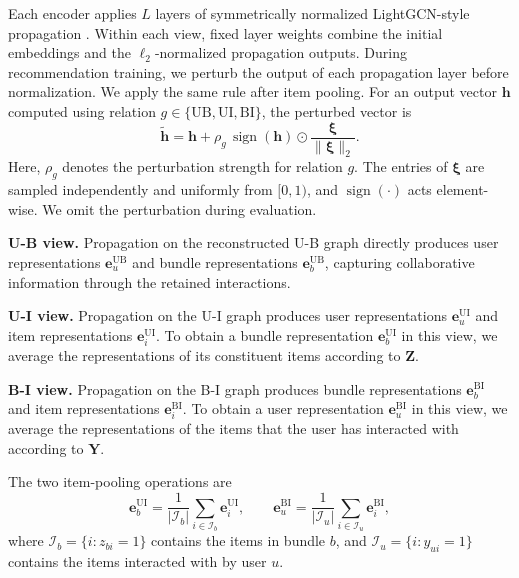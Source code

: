 \documentclass[letterpaper,journal]{IEEEtran}
\begin{document}
Each encoder applies $L$ layers of symmetrically normalized LightGCN-style propagation \cite{he2020lightgcn}. Within each view, fixed layer weights combine the initial embeddings and the $\ell_2$-normalized propagation outputs. During recommendation training, we perturb the output of each propagation layer before normalization. We apply the same rule after item pooling. For an output vector $\mathbf h$ computed using relation $g\in\{\mathrm{UB},\mathrm{UI},\mathrm{BI}\}$, the perturbed vector is
\begin{equation}
\widetilde{\mathbf h}
=\mathbf h+\rho_g\,\operatorname{sign}(\mathbf h)
\odot\frac{\boldsymbol\xi}{\|\boldsymbol\xi\|_2}.
\tag{13}
\end{equation}
Here, $\rho_g$ denotes the perturbation strength for relation $g$. The entries of $\boldsymbol\xi$ are sampled independently and uniformly from $[0,1)$, and $\operatorname{sign}(\cdot)$ acts element-wise. We omit the perturbation during evaluation.

\textbf{U-B view.} Propagation on the reconstructed U-B graph directly produces user representations $\mathbf e_u^{\mathrm{UB}}$ and bundle representations $\mathbf e_b^{\mathrm{UB}}$, capturing collaborative information through the retained interactions.

\textbf{U-I view.} Propagation on the U-I graph produces user representations $\mathbf e_u^{\mathrm{UI}}$ and item representations $\mathbf e_i^{\mathrm{UI}}$. To obtain a bundle representation $\mathbf e_b^{\mathrm{UI}}$ in this view, we average the representations of its constituent items according to $\mathbf Z$.

\textbf{B-I view.} Propagation on the B-I graph produces bundle representations $\mathbf e_b^{\mathrm{BI}}$ and item representations $\mathbf e_i^{\mathrm{BI}}$. To obtain a user representation $\mathbf e_u^{\mathrm{BI}}$ in this view, we average the representations of the items that the user has interacted with according to $\mathbf Y$.

The two item-pooling operations are
\begin{equation}
\mathbf e_b^{\mathrm{UI}}
=\frac{1}{|\mathcal I_b|}
\sum_{i\in\mathcal I_b}\mathbf e_i^{\mathrm{UI}},
\qquad
\mathbf e_u^{\mathrm{BI}}
=\frac{1}{|\mathcal I_u|}
\sum_{i\in\mathcal I_u}\mathbf e_i^{\mathrm{BI}},
\tag{14}
\end{equation}
where $\mathcal I_b=\{i:z_{bi}=1\}$ contains the items in bundle $b$, and $\mathcal I_u=\{i:y_{ui}=1\}$ contains the items interacted with by user $u$.
\end{document}
